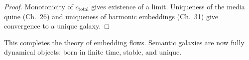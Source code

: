 \begin{proof}
Monotonicity of $c_{\mathrm{total}}$ gives existence of a limit.  
Uniqueness of the media quine (Ch.~26) and uniqueness of harmonic embeddings
(Ch.~31) give convergence to a unique galaxy.  
\end{proof}

\medskip

This completes the theory of embedding flows.  
Semantic galaxies are now fully dynamical objects: born in finite time,
stable, and unique.
